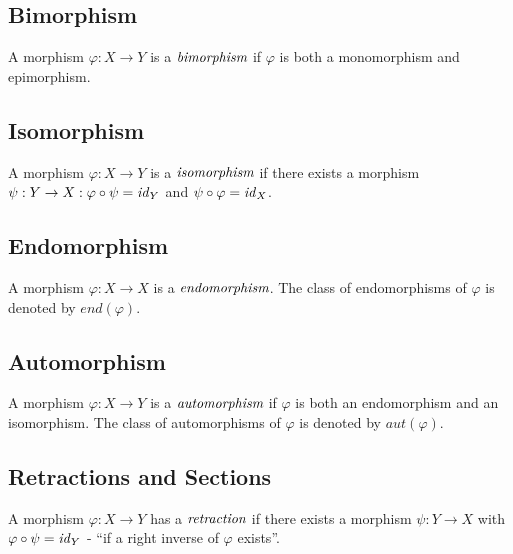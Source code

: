\subsection{Bimorphism} %
\label{subsec:bimorphism}
\begin{defn}[Bimorphism]
 A morphism $\varphi: X \to Y$ is a $\emph{bimorphism}$ if $\varphi$ is both a monomorphism and epimorphism.
\end{defn}

\subsection{Isomorphism} %
\label{subsec:isomorphism}
\begin{defn}[Isomorphism]
 A morphism $\varphi: X \to Y$ is a $\emph{isomorphism}$ if there exists a morphism $\psi: Y \to X : \varphi \circ \psi = \mathit{id}_{Y}$ and $\psi \circ \varphi = \mathit{id}_{X}$.
\end{defn}

\subsection{Endomorphism} %
\label{subsec:endomorphism}
\begin{defn}[Endomorphism]
 A morphism $\varphi: X \to X$ is a $\emph{endomorphism}$.
 The class of endomorphisms of $\varphi$ is denoted by $end(\varphi)$.
\end{defn}

\subsection{Automorphism} %
\label{subsec:automorphism}
\begin{defn}[Automorphism]
 A morphism $\varphi: X \to Y$ is a $\emph{automorphism}$ if $\varphi$ is both an endomorphism and an isomorphism.
 The class of automorphisms of $\varphi$ is denoted by $aut(\varphi)$.
\end{defn}

\subsection{Retractions and Sections} %
\label{subsec:retractionsandsections}
\begin{defn}[Retraction]
 A morphism $\varphi: X \to Y$ has a $\emph{retraction}$ if there exists a morphism $\psi: Y \to X$ with $\varphi \circ \psi = \mathit{id}_{Y}$ - ``if a right inverse of $\varphi$ exists''.
\end{defn}

